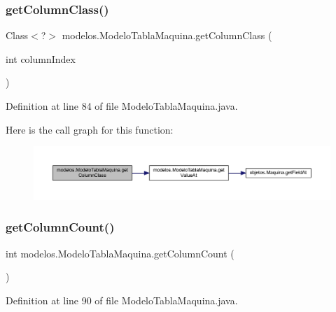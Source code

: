 \subsubsection{\texorpdfstring{get\+Column\+Class()}{getColumnClass()}}
{\footnotesize\ttfamily Class$<$?$>$ modelos.\+Modelo\+Tabla\+Maquina.\+get\+Column\+Class (\begin{DoxyParamCaption}\item[{int}]{column\+Index }\end{DoxyParamCaption})}



Definition at line 84 of file Modelo\+Tabla\+Maquina.\+java.

Here is the call graph for this function\+:\nopagebreak
\begin{figure}[H]
\begin{center}
\leavevmode
\includegraphics[width=350pt]{classmodelos_1_1_modelo_tabla_maquina_a29f3df9756e2a5e9a66bde094a1ee56e_cgraph}
\end{center}
\end{figure}
\mbox{\label{classmodelos_1_1_modelo_tabla_maquina_a83f4d721197d932523e11de1155cbad6}} 
\subsubsection{\texorpdfstring{get\+Column\+Count()}{getColumnCount()}}
{\footnotesize\ttfamily int modelos.\+Modelo\+Tabla\+Maquina.\+get\+Column\+Count (\begin{DoxyParamCaption}{ }\end{DoxyParamCaption})}



Definition at line 90 of file Modelo\+Tabla\+Maquina.\+java.

\mbox{\label{classmodelos_1_1_modelo_tabla_maquina_a557771e167f337141e22d3d4a0432b7b}} 
